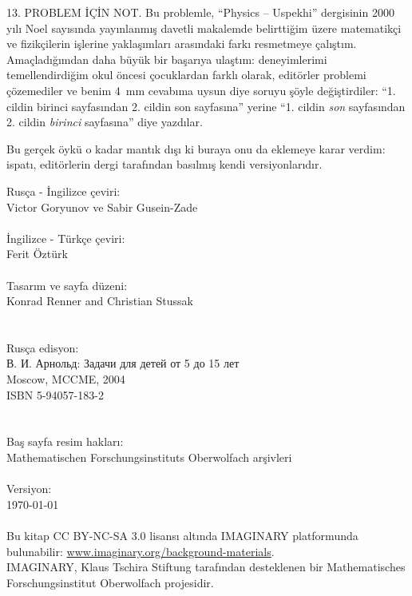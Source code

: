 \begin{note}{13. PROBLEM {\. I}Ç{\. I}N NOT.}
	Bu problemle, \enquote{Physics -- Uspekhi} der\-gi\-si\-nin 2000 yılı Noel sayısında yayınlanmış davetli makalemde be\-lirt\-ti\-ğim üzere matematikçi ve fizikçilerin işlerine yaklaşımları arasındaki farkı res\-met\-me\-ye çalıştım. Amaçladığımdan daha büyük bir başarıya ulaş\-tım:  de\-ne\-yim\-le\-ri\-mi temellendirdiğim okul öncesi çocuklardan farklı olarak, editörler problemi çözemediler ve benim  \SI{4}{\mm} cevabıma uysun diye soruyu şöyle değiştirdiler: \enquote{1. cildin birinci sayfasından 2. cildin son sayfasına} yerine \enquote{1. cildin \emph{son} sayfasından 2. cildin \emph{birinci} say\-fa\-sı\-na} diye yazdılar.

	Bu gerçek öykü o kadar mantık dışı ki buraya onu da eklemeye karar verdim: ispatı, editörlerin dergi tarafından basılmış kendi ver\-si\-yon\-la\-rı\-dır.
\end{note}
\clearpage
\null\vfill
\noindent
Rusça - İngilizce çeviri:\\
\null\quad Victor Goryunov ve Sabir Gusein-Zade\\
\\
İngilizce - Türkçe çeviri:\\
\null\quad Ferit Öztürk\\
\\
Tasarım ve sayfa düzeni:\\
\null\quad Konrad Renner and Christian Stussak\\
\\
\\
Rusça edisyon:\\
\null\quad \textrussian{В. И. Арнольд: Задачи для детей от 5 до 15 лет}\\
\null\quad Moscow, MCCME, 2004\\
\null\quad ISBN 5-94057-183-2\\
\\
\\
Baş sayfa resim hakları:\\
\null\quad Mathematischen Forschungsinstituts Oberwolfach arşivleri\\
\\
Versiyon:\\
\null\quad \today\\
\\
Bu kitap CC BY-NC-SA 3.0 lisansı altında IMAG\-I\-NARY platformunda bulunabilir: \href{http://www.imaginary.org/background-materials}{www.imaginary.org/background-materials}.\\
IMAGINARY, Klaus Tschira Stiftung tarafından desteklenen bir Mathematisches Forschungsinstitut Oberwolfach projesidir.




